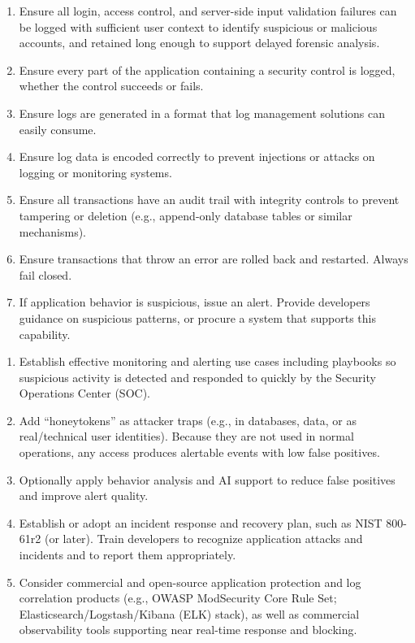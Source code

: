 \documentclass[11pt]{article}
\begin{document}
\begin{controlbox}
\begin{enumerate}
  \item Ensure all login, access control, and server-side input validation failures can be logged with sufficient user context to identify suspicious or malicious accounts, and retained long enough to support delayed forensic analysis.
  \item Ensure every part of the application containing a security control is logged, whether the control succeeds or fails.
  \item Ensure logs are generated in a format that log management solutions can easily consume.
  \item Ensure log data is encoded correctly to prevent injections or attacks on logging or monitoring systems.
  \item Ensure all transactions have an audit trail with integrity controls to prevent tampering or deletion (e.g., append-only database tables or similar mechanisms).
  \item Ensure transactions that throw an error are rolled back and restarted. Always fail closed.
  \item If application behavior is suspicious, issue an alert. Provide developers guidance on suspicious patterns, or procure a system that supports this capability.
\end{enumerate}
\end{controlbox}

\begin{controlbox}
\begin{enumerate}[resume]
  \item Establish effective monitoring and alerting use cases including playbooks so suspicious activity is detected and responded to quickly by the Security Operations Center (SOC).
  \item Add ``honeytokens'' as attacker traps (e.g., in databases, data, or as real/technical user identities). Because they are not used in normal operations, any access produces alertable events with low false positives.
  \item Optionally apply behavior analysis and AI support to reduce false positives and improve alert quality.
  \item Establish or adopt an incident response and recovery plan, such as NIST 800-61r2 (or later). Train developers to recognize application attacks and incidents and to report them appropriately.
  \item Consider commercial and open-source application protection and log correlation products (e.g., OWASP ModSecurity Core Rule Set; Elasticsearch/Logstash/Kibana (ELK) stack), as well as commercial observability tools supporting near real-time response and blocking.
\end{enumerate}
\end{controlbox}
\end{document}
